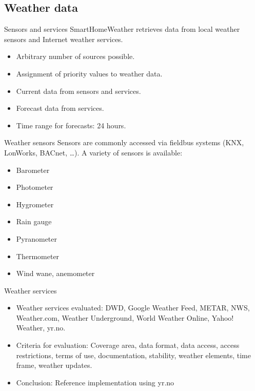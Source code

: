 \documentclass{beamer}
\begin{document}
\subsection{Weather data}

\begin{frame}{Sensors and services}
	SmartHomeWeather retrieves data from local weather sensors and Internet weather services.

	\begin{itemize}
		\item Arbitrary number of sources possible.
		\item Assignment of priority values to weather data.
		\item Current data from sensors and services.
		\item Forecast data from services.
		\item Time range for forecasts: 24 hours.
	\end{itemize}
\end{frame}

\begin{frame}{Weather sensors}
	Sensors are commonly accessed via fieldbus systems (KNX, LonWorks, BACnet, …).
	A variety of sensors is available:
	\begin{itemize}
		\item Barometer
		\item Photometer
		\item Hygrometer
		\item Rain gauge
		\item Pyranometer
		\item Thermometer
		\item Wind wane, anemometer
	\end{itemize}
\end{frame}

\begin{frame}{Weather services}
	\begin{itemize}
		\item Weather services evaluated: DWD, Google Weather Feed, METAR, NWS, Weather.com, Weather Underground, World Weather Online, Yahoo! Weather, yr.no.
		\item Criteria for evaluation: Coverage area, data format, data access, access restrictions, terms of use, documentation, stability, weather elements, time frame, weather updates.
		\item Conclusion: Reference implementation using yr.no
	\end{itemize}
\end{frame}
\end{document}
